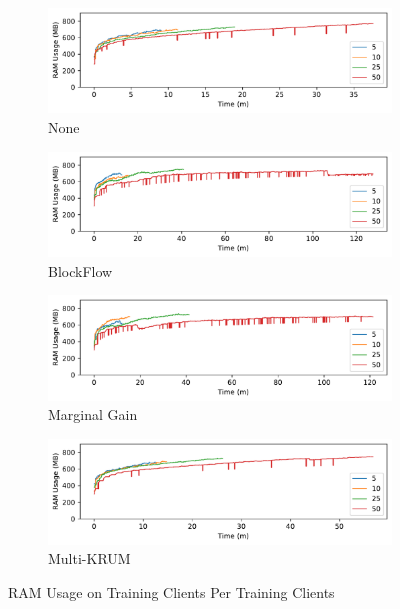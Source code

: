 \clearpage

\begin{figure}[!h]
    \centering
    \begin{subfigure}[b]{0.49\textwidth}
        \centering
        \includegraphics[width=\textwidth]{graphics/clients/ram_none_client.pdf}
        \caption{None}
    \end{subfigure}
    \hfill
    \begin{subfigure}[b]{0.49\textwidth}
        \centering
        \includegraphics[width=\textwidth]{graphics/clients/ram_blockflow_client.pdf}
        \caption{BlockFlow}
    \end{subfigure}
    \hfill
    \begin{subfigure}[b]{0.49\textwidth}
        \centering
        \includegraphics[width=\textwidth]{graphics/clients/ram_marginalgain_client.pdf}
        \caption{Marginal Gain}
    \end{subfigure}
    \hfill
    \begin{subfigure}[b]{0.49\textwidth}
        \centering
        \includegraphics[width=\textwidth]{graphics/clients/ram_multikrum_client.pdf}
        \caption{Multi-KRUM}
    \end{subfigure}
    \caption{RAM Usage on Training Clients Per Training Clients}
    \label{fig:ram_clients_degree_clients}
\end{figure}

